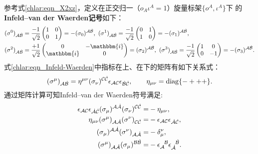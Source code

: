 参考式\eqref{chlar:eqn_X2xz}，定义在正交归一（$o_A \iota^A =1$）旋量标架$\{o^A,\iota^A\}$下
的{\heiti \bfseries Infeld--van der Waerden记号}如下：
\setlength{\mathindent}{0em}
\begin{equation}\label{chlar:eqn_Infeld-Waerden}
    \begin{aligned}
        &(\sigma^0)_{{\mathcal{A}} \dot{\mathcal{B}}} = \frac{-1}{\sqrt{2}} \begin{pmatrix} 1 & 0 \\ 0 & 1 \end{pmatrix}
        = - (\sigma_0)^{{\mathcal{A}} \dot{\mathcal{B}}}, \
        (\sigma^1)_{{\mathcal{A}} \dot{\mathcal{B}}} = \frac{-1}{\sqrt{2}} \begin{pmatrix} 0 & 1 \\ 1 & 0 \end{pmatrix}
        =-(\sigma_1)^{{\mathcal{A}} \dot{\mathcal{B}}}, \\
        &(\sigma^2)_{{\mathcal{A}} \dot{\mathcal{B}}} = \frac{+1}{\sqrt{2}} \begin{pmatrix} 0 & 
            -\mathbbm{i} \\ \mathbbm{i} & 0 \end{pmatrix} =(\sigma_2)^{{\mathcal{A}} \dot{\mathcal{B}}}, \
        (\sigma^3)_{{\mathcal{A}} \dot{\mathcal{B}}} = \frac{-1}{\sqrt{2}} \begin{pmatrix} 1 & 0 \\ 0 & -1 \end{pmatrix}
        =-(\sigma_3)^{{\mathcal{A}} \dot{\mathcal{B}}}. 
    \end{aligned}
\end{equation}\setlength{\mathindent}{2em}
式\eqref{chlar:eqn_Infeld-Waerden}中指标在上、在下的矩阵有如下关系式：
\begin{equation}\label{chlar:eqn_sud}
    (\sigma^\mu)_{{\mathcal{A}} \dot{\mathcal{B}}} = \eta^{\mu \nu} (\sigma_\nu)^{{\mathcal{C}} \dot{\mathcal{C}}}
    \epsilon_{\mathcal{A}\mathcal{C}} \epsilon_{\dot{\mathcal{B}}\dot{\mathcal{C}}}, \qquad \eta_{\mu \nu}={\rm diag}\{-+++\}.
\end{equation}
通过矩阵计算可知Infeld--van der Waerden符号满足:
\begin{align}
    \epsilon_{\mathcal{A}\mathcal{C}} \epsilon_{\dot{\mathcal{A}}\dot{\mathcal{C}}}
    (\sigma_\mu)^{{\mathcal{A}} \dot{\mathcal{A}}} (\sigma_\nu)^{ {\mathcal{C}} \dot{\mathcal{C}}}
    =&- \eta_{\mu\nu} ,  \label{chlar:eqn_eemetric-1} \\
    \eta_{\mu\nu} (\sigma^\mu)_{{\mathcal{A}} \dot{\mathcal{A}}}(\sigma^\nu)_{{\mathcal{C}} \dot{\mathcal{C}}}=&
    -\epsilon_{\mathcal{A}\mathcal{C}} \epsilon_{\dot{\mathcal{A}}\dot{\mathcal{C}}}, \label{chlar:eqn_eemetric-2} \\
    (\sigma_\mu)^{{\mathcal{A}} \dot{\mathcal{A}}} (\sigma^\nu)_{{\mathcal{A}} \dot{\mathcal{A}}} =&  -\delta_\mu^\nu,
    \label{chlar:eqn_ssd} \\
    (\sigma^\mu)_{{\mathcal{A}} \dot{\mathcal{A}}}  (\sigma_\mu)^{{\mathcal{B}} \dot{\mathcal{B}}} = &-
    \epsilon_{\mathcal{A}}^{\hphantom{A}\mathcal{B}} \epsilon_{\dot{{\mathcal{A}}}}^{\hphantom{A} \dot{\mathcal{B}}}.
    \label{chlar:eqn_ssdd}
\end{align}


